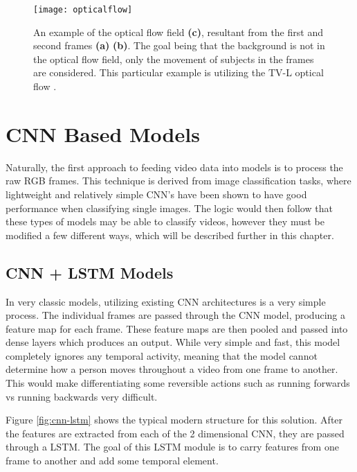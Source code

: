 \begin{figure}[h]
	\texttt{[image: opticalflow]}
	\centering
	\caption{An example of the optical flow field \textbf{(c)}, resultant from the first and second frames \textbf{(a)} \textbf{(b)}. The goal being that the background is not in the optical flow field, only the movement of subjects in the frames are considered. This particular example is utilizing the TV-L optical flow \cite{TV-L}.}
	\label{fig:opticalflow}
\end{figure}


\section{CNN Based Models}

Naturally, the first approach to feeding video data into models is to process the raw RGB frames. This technique is derived from image classification tasks, where lightweight and relatively simple CNN's have been shown to have good performance when classifying single images. The logic would then follow that these types of models may be able to classify videos, however they must be modified a few different ways, which will be described further in this chapter.

\subsection{CNN + LSTM Models}

In very classic models, utilizing existing CNN architectures is a very simple process. The individual frames are passed through the CNN model, producing a feature map for each frame. These feature maps are then pooled and passed into dense layers which produces an output. While very simple and fast, this model completely ignores any temporal activity, meaning that the model cannot determine how a person moves throughout a video from one frame to another. This would make differentiating some reversible actions such as running forwards vs running backwards very difficult.

Figure \ref{fig:cnn-lstm} shows the typical modern structure for this solution. After the features are extracted from each of the 2 dimensional CNN, they are passed through a LSTM. The goal of this LSTM module is to carry features from one frame to another and add some temporal element.

